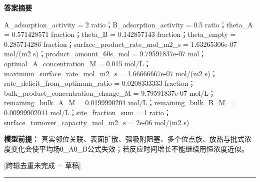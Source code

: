 \documentclass[UTF8,11pt,a4paper]{ctexart}
\begin{document}
\noindent\textbf{答案摘要}\par
A\_adsorption\_activity = 2 ratio；B\_adsorption\_activity = 0.5 ratio；theta\_A = 0.571428571 fraction；theta\_B = 0.142857143 fraction；theta\_empty = 0.285714286 fraction；surface\_product\_rate\_mol\_m2\_s = 1.63265306e-07 mol/(m2 s)；product\_amount\_60s\_mol = 9.79591837e-07 mol；optimal\_A\_concentration\_M = 0.015 mol/L；maximum\_surface\_rate\_mol\_m2\_s = 1.66666667e-07 mol/(m2 s)；rate\_deficit\_from\_optimum\_ratio = 0.0208333333 fraction；bulk\_product\_concentration\_change\_M = 9.79591837e-07 mol/L；remaining\_bulk\_A\_M = 0.0199990204 mol/L；remaining\_bulk\_B\_M = 0.00999902041 mol/L；site\_fraction\_sum = 1 ratio；surface\_turnover\_capacity\_mol\_m2\_s = 2e-06 mol/(m2 s)\par
\noindent\textbf{模型前提：}
真实邻位关联、表面扩散、强吸附阻塞、多个位点族、放热与批式浓度变化会使平均场θ\_Aθ\_B公式失效；若反应时间增长不能继续用恒浓度近似。\par
\noindent\textcolor{red!65!black}{[跨辑去重未完成 · 草稿]} \par
\medskip\hrule\medskip
{}
\end{document}
